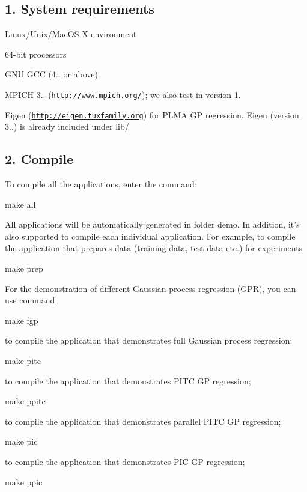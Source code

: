 \subsection*{1. System requirements }

Linux/\+Unix/\+Mac\+O\+S X environment

64-\/bit processors

G\+N\+U G\+C\+C (4.. or above)

M\+P\+I\+C\+H 3.. (\href{http://www.mpich.org/}{\tt http\+://www.\+mpich.\+org/}); we also test in version 1.

Eigen (\href{http://eigen.tuxfamily.org}{\tt http\+://eigen.\+tuxfamily.\+org}) for P\+L\+M\+A G\+P regression, Eigen (version 3..) is already included under lib/

\subsection*{2. Compile }

To compile all the applications, enter the command\+: \begin{DoxyVerb}make all
\end{DoxyVerb}


All applications will be automatically generated in folder demo. In addition, it's also supported to compile each individual application. For example, to compile the application that prepares data (training data, test data etc.) for experiments

make prep

For the demonstration of different Gaussian process regression (G\+P\+R), you can use command \begin{DoxyVerb}make fgp
\end{DoxyVerb}


to compile the application that demonstrates full Gaussian process regression; \begin{DoxyVerb}make pitc 
\end{DoxyVerb}


to compile the application that demonstrates P\+I\+T\+C G\+P regression; \begin{DoxyVerb}make ppitc 
\end{DoxyVerb}


to compile the application that demonstrates parallel P\+I\+T\+C G\+P regression; \begin{DoxyVerb}make pic
\end{DoxyVerb}


to compile the application that demonstrates P\+I\+C G\+P regression; \begin{DoxyVerb}make ppic
\end{DoxyVerb}


